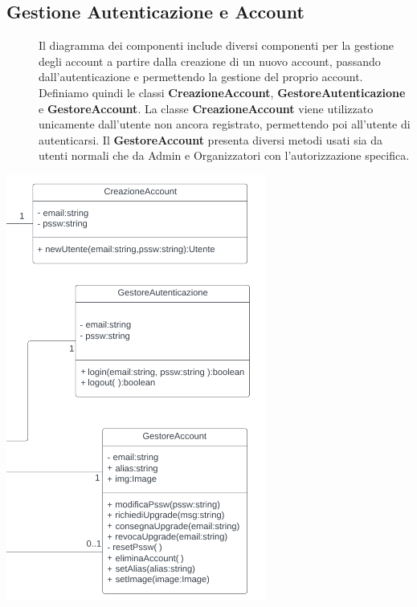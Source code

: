 \documentclass{article}
\begin{document}
\subsection{Gestione Autenticazione e Account}
\begin{description}
    \item[] Il diagramma dei componenti include diversi componenti per la gestione degli account a partire dalla creazione di un nuovo account, passando dall'autenticazione e permettendo la gestione del proprio account. Definiamo quindi le classi \textbf{CreazioneAccount}, \textbf{GestoreAutenticazione} e \textbf{GestoreAccount}. La classe \textbf{CreazioneAccount} viene utilizzato unicamente dall'utente non ancora registrato, permettendo poi all'utente di autenticarsi. Il \textbf{GestoreAccount} presenta diversi metodi usati sia da utenti normali che da Admin e Organizzatori con l'autorizzazione specifica.
\end{description}
\begin{center}
    \item[] \includegraphics[scale=0.7]{account.png}
\end{center}
\newpage
\end{document}
